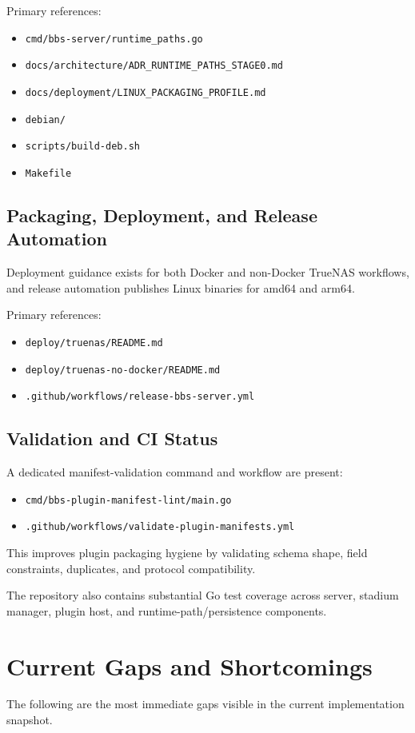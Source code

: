 \documentclass[11pt]{article}
\begin{document}
Primary references:
\begin{itemize}[leftmargin=*]
  \item \texttt{cmd/bbs-server/runtime\_paths.go}
  \item \texttt{docs/architecture/ADR\_RUNTIME\_PATHS\_STAGE0.md}
  \item \texttt{docs/deployment/LINUX\_PACKAGING\_PROFILE.md}
  \item \texttt{debian/}
  \item \texttt{scripts/build-deb.sh}
  \item \texttt{Makefile}
\end{itemize}

\subsection{Packaging, Deployment, and Release Automation}
Deployment guidance exists for both Docker and non-Docker TrueNAS workflows, and release automation publishes Linux binaries for amd64 and arm64.

Primary references:
\begin{itemize}[leftmargin=*]
  \item \texttt{deploy/truenas/README.md}
  \item \texttt{deploy/truenas-no-docker/README.md}
  \item \texttt{.github/workflows/release-bbs-server.yml}
\end{itemize}

\subsection{Validation and CI Status}
A dedicated manifest-validation command and workflow are present:
\begin{itemize}[leftmargin=*]
  \item \texttt{cmd/bbs-plugin-manifest-lint/main.go}
  \item \texttt{.github/workflows/validate-plugin-manifests.yml}
\end{itemize}

This improves plugin packaging hygiene by validating schema shape, field constraints, duplicates, and protocol compatibility.

The repository also contains substantial Go test coverage across server, stadium manager, plugin host, and runtime-path/persistence components.

\section{Current Gaps and Shortcomings}
The following are the most immediate gaps visible in the current implementation snapshot.
\end{document}

